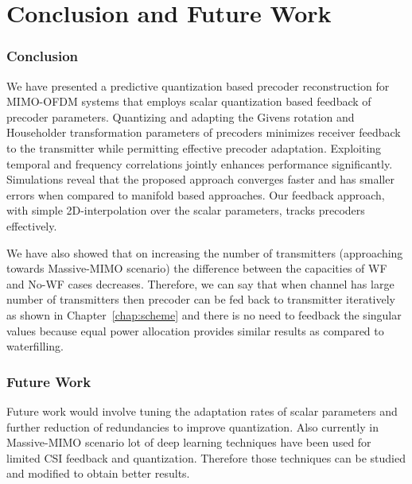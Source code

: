 \documentclass[11pt,a4paper]{report}
\begin{document}
\chapter{Conclusion and Future Work}
\subsection{Conclusion}
We have presented a predictive quantization based precoder
reconstruction for MIMO-OFDM systems that employs scalar quantization
based feedback of precoder parameters. Quantizing and adapting the
Givens rotation and Householder transformation parameters of precoders
minimizes receiver feedback to the transmitter while permitting
effective precoder adaptation. Exploiting temporal and frequency
correlations jointly enhances performance significantly. Simulations
reveal that the proposed approach converges faster and has smaller
errors when compared to manifold based approaches. Our feedback
approach, with simple 2D-interpolation over the scalar parameters,
tracks precoders effectively.

We have also showed that on increasing the number of transmitters (approaching towards Massive-MIMO scenario)
the difference between the capacities of WF and No-WF cases decreases.
Therefore, we can say that when channel has large number of transmitters
then precoder can be fed back to transmitter iteratively as shown in Chapter~\ref{chap:scheme}
and there is no need to feedback the singular values because equal power 
allocation provides similar results as compared to waterfilling.

\subsection{Future Work}
Future work would involve tuning the adaptation rates of scalar 
parameters and further reduction of redundancies to improve quantization.
Also currently in Massive-MIMO scenario lot of deep learning techniques have been 
used for limited CSI feedback and quantization. Therefore those techniques
can be studied and modified to obtain better results.


\end{document}
